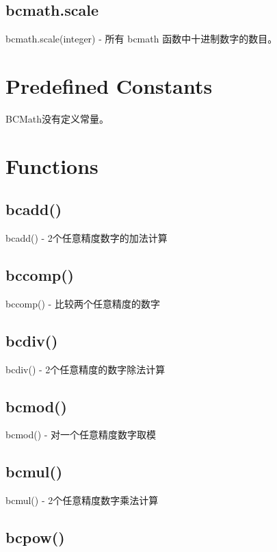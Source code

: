 \subsection{bcmath.scale}

bcmath.scale(integer) - 所有 bcmath 函数中十进制数字的数目。



\section{Predefined Constants}

BCMath没有定义常量。


\section{Functions}


\subsection{bcadd()}


bcadd() - 2个任意精度数字的加法计算


\subsection{bccomp()}

bccomp() - 比较两个任意精度的数字


\subsection{bcdiv()}

bcdiv() - 2个任意精度的数字除法计算


\subsection{bcmod()}


bcmod() - 对一个任意精度数字取模


\subsection{bcmul()}

bcmul() - 2个任意精度数字乘法计算


\subsection{bcpow()}

